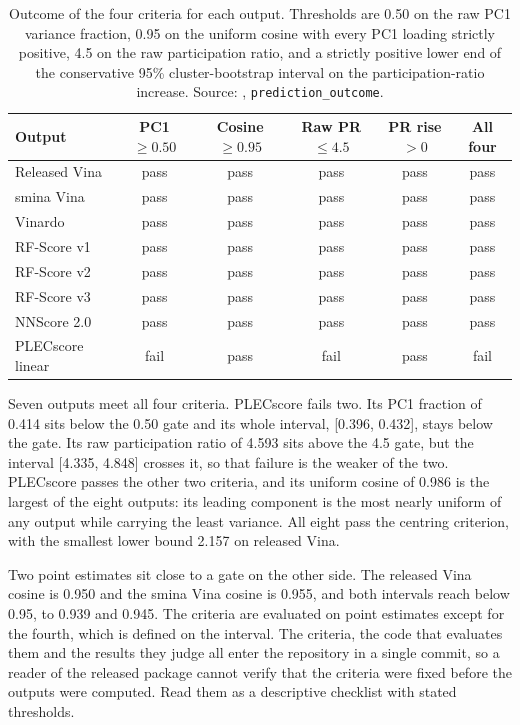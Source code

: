 \begin{table}[htbp]
\centering
\caption{Outcome of the four criteria for each output. Thresholds are 0.50 on the raw PC1
variance fraction, 0.95 on the uniform cosine with every PC1 loading strictly positive, 4.5 on
the raw participation ratio, and a strictly positive lower end of the conservative 95\%
cluster-bootstrap interval on the participation-ratio increase. Source:
\protect{}, \texttt{prediction\_outcome}.}
\label{tab:s3criteria}
\small
\begin{tabular}{lccccc}
\toprule
Output & PC1 $\geq 0.50$ & Cosine $\geq 0.95$ & Raw PR $\leq 4.5$ & PR rise $> 0$ & All four \\
\midrule
Released Vina & pass & pass & pass & pass & pass \\
smina Vina & pass & pass & pass & pass & pass \\
Vinardo & pass & pass & pass & pass & pass \\
RF-Score v1 & pass & pass & pass & pass & pass \\
RF-Score v2 & pass & pass & pass & pass & pass \\
RF-Score v3 & pass & pass & pass & pass & pass \\
NNScore 2.0 & pass & pass & pass & pass & pass \\
PLECscore linear & fail & pass & fail & pass & fail \\
\bottomrule
\end{tabular}
\end{table}

Seven outputs meet all four criteria. PLECscore fails two. Its PC1 fraction of 0.414 sits
below the 0.50 gate and its whole interval, [0.396, 0.432], stays below the gate. Its raw
participation ratio of 4.593 sits above the 4.5 gate, but the interval [4.335, 4.848] crosses
it, so that failure is the weaker of the two. PLECscore passes the other two criteria, and its
uniform cosine of 0.986 is the largest of the eight outputs: its leading component is the most
nearly uniform of any output while carrying the least variance. All eight pass the centring
criterion, with the smallest lower bound 2.157 on released Vina.

Two point estimates sit close to a gate on the other side. The released Vina cosine is 0.950
and the smina Vina cosine is 0.955, and both intervals reach below 0.95, to 0.939 and 0.945.
The criteria are evaluated on point estimates except for the fourth, which is defined on the
interval. The criteria, the code that evaluates them and the results they judge all enter the
repository in a single commit, so a reader of the released package cannot verify that the
criteria were fixed before the outputs were computed. Read them as a descriptive checklist
with stated thresholds.


